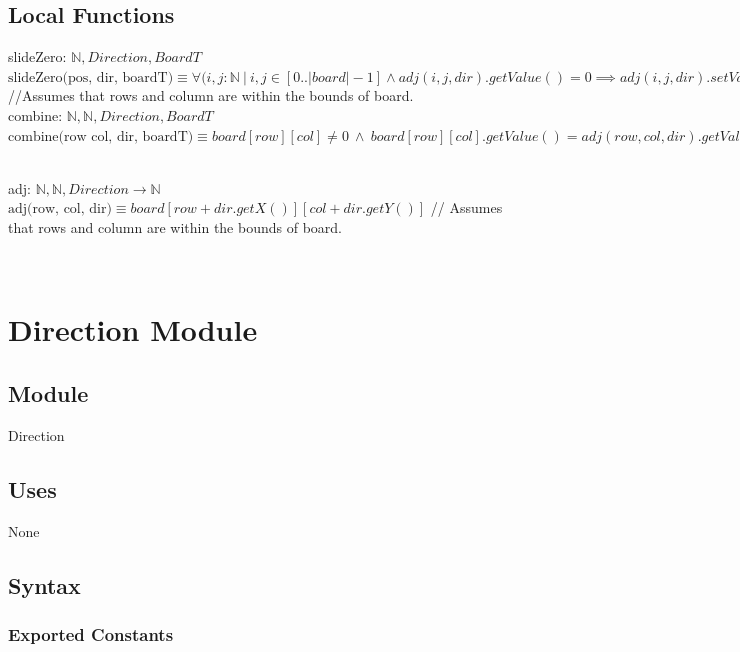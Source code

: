 \documentclass[12pt]{article}
\begin{document}
\subsection*{Local Functions}

\noindent slideZero: $\mathbb{N}, Direction, BoardT$\\
\noindent $\mbox{slideZero(pos, dir, boardT)} \equiv \forall(i,j : \mathbb{N}\ |\ i,j \in [0..|board|-1] \land adj(i,j,dir).getValue() = 0 \implies adj(i,j,dir).setValue(board[i][j].getValue())$ //Assumes that rows and column are within the bounds of board.
~\\

\noindent combine: $\mathbb{N}, \mathbb{N}, Direction, BoardT$\\
\noindent $\mbox{combine(row col, dir, boardT)} \equiv board[row][col] \neq 0 
\ \land \ board[row][col].getValue() = adj(row,col,dir).getValue() \implies adj(row,col,dir).add() \land board[row][col].setValue(0))$

~\\

\noindent adj: $\mathbb{N}, \mathbb{N}, Direction \rightarrow \mathbb{N}$\\
\noindent $\mbox{adj(row, col, dir)} \equiv board[row+dir.getX()][col+dir.getY()]$ // Assumes that rows and column are within the bounds of board.

~\\


\newpage

\section* {Direction Module}

\subsection*{Module}

Direction

\subsection* {Uses}

None

\subsection* {Syntax}

\subsubsection* {Exported Constants}
\end{document}

